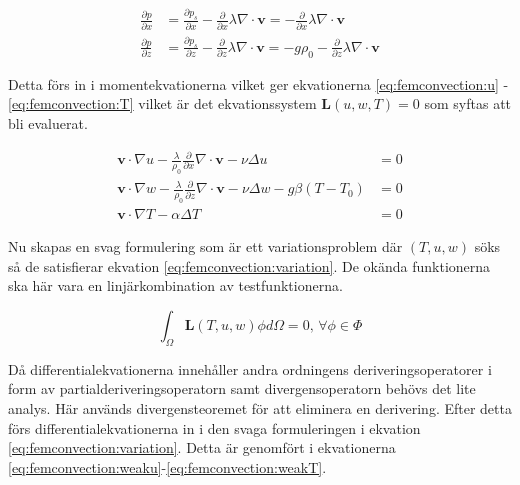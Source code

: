 \begin{align}
\label{eq:femconvection:partx}
\frac{\partial p}{\partial x} &= \frac{\partial p_s}{\partial x} -
\frac{\partial}{\partial x} \lambda\nabla\cdot\mathbf{v} = -
\frac{\partial}{\partial x} \lambda\nabla\cdot\mathbf{v}
\\
\label{eq:femconvection:partz}
\frac{\partial p}{\partial z} &= \frac{\partial p_s}{\partial z} -
\frac{\partial}{\partial z} \lambda\nabla\cdot\mathbf{v} =
-g\rho_0 - \frac{\partial}{\partial z} \lambda\nabla\cdot\mathbf{v}
\end{align}

\noindent
Detta förs in i momentekvationerna vilket ger ekvationerna \eqref{eq:femconvection:u} -
\eqref{eq:femconvection:T} vilket är det ekvationssystem $\mathbf{L}(u,w,T) = 0$
som syftas att bli evaluerat.

\begin{align}
\label{eq:femconvection:u}
\mathbf{v}\cdot\nabla u -
\frac{\lambda}{\rho_0}\frac{\partial}{\partial x}\nabla\cdot\mathbf{v} -\nu\Delta u &= 0
\\
\label{eq:femconvection:w}
\mathbf{v}\cdot\nabla w -
\frac{\lambda}{\rho_0}\frac{\partial}{\partial z}\nabla\cdot\mathbf{v}
- \nu\Delta w - g\beta(T-T_0) &= 0 \\ 
\label{eq:femconvection:T}
\mathbf{v}\cdot\nabla T - \alpha\Delta T &= 0
\end{align}

\noindent
Nu skapas en svag formulering som är ett variationsproblem där $(T,u,w)$ söks
så de satisfierar ekvation \eqref{eq:femconvection:variation}. De okända funktionerna
ska här vara en linjärkombination av testfunktionerna.

\begin{equation}
\label{eq:femconvection:variation}
\int_\Omega \mathbf{L}(T,u,w) \phi d\Omega = 0\mbox{,  } \forall \phi \in \Phi
\end{equation}

\noindent
Då differentialekvationerna innehåller andra ordningens deriveringsoperatorer i form av
partialderiveringsoperatorn samt divergensoperatorn behövs det lite analys.
Här används divergensteoremet för att eliminera en derivering. Efter detta
förs differentialekvationerna in i den svaga formuleringen i ekvation
\eqref{eq:femconvection:variation}.
Detta är genomfört i 
ekvationerna \eqref{eq:femconvection:weaku}-\eqref{eq:femconvection:weakT}.

